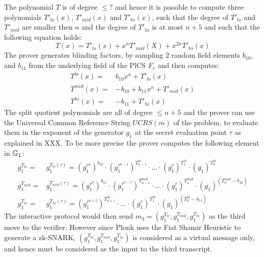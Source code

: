 The polynomial $T$ is of degree $\leq ?$ and hence it is possible to compute three polynomials $T'_{lo}(x)$, $T'_{mid}(x)$ and $T'_{hi}(x)$, such that the degree of $T'_{lo}$ and $T'_{mid}$ are smaller then $n$ and the degree of $T'_{hi}$ is at most $n+5$ and such that the following equation holds:
\begin{equation}
T(x) = T'_{lo}(x) + x^n T'_{mid}(X) + x^{2n} T'_{hi}(x)
\end{equation}
The prover generates blinding factors, by sampling $2$ random field elements $b_{10}$, and $b_{11}$ from the underlying field of the PlCS $F_r$ and then computes:
\begin{equation}
\begin{array}{rl}
T^{lo}(x)  = & b_{10} x^n + T'_{lo}(x) \\
T^{mid}(x) = & - b_{10} + b_{11} x^n +T'_{mid}(x) \\
T^{hi}(x)  = & - b_{11} + T'_{hi}(x)
\end{array}
\end{equation}
The split quotient polynomials are all of degree $\leq n+5$ and the prover can use the Universal Common Reference String $UCRS(m)$ of the problem, to evaluate them in the exponent of the generator $g_1$ at the secret evaluation point $\tau$ as explained in XXX. To be more precise the prover computes the following element in $\mathbb{G}_1$: 
\begin{equation}
\begin{array}{rl}
g_1^{T_{lo}} = & g_1^{T_{lo}(\tau)} = \left(g_1^{\tau^n}\right)^{b_{10}}\cdot
\left(g_1^{\tau^{n-1}}\right)^{T^{lo}_{n-1}}\cdot\ldots\cdot \left(g_1^{\tau}\right)^{T^{lo}_{1}}\cdot \left(g_1\right)^{T^{lo}_{0}}\\
g_1^{T_{mid}} = & g_1^{T_{mid}(\tau)} = \left(g_1^{\tau^n}\right)^{b_{11}}\cdot
\left(g_1^{\tau^{n-1}}\right)^{T^{mid}_{n-1}}\cdot\ldots\cdot \left(g_1^{\tau}\right)^{T^{mid}_{1}}\cdot \left(g_1\right)^{(T^{mid}_{0}-b_{10})}\\
g_1^{T_{hi}} = & g_1^{T_{hi}(\tau)} =
\left(g_1^{\tau^{n+5}}\right)^{T^{hi}_{n+1}}\cdot\ldots\cdot \left(g_1^{\tau}\right)^{T^{hi}_{1}}\cdot \left(g_1\right)^{(T^{hi}_{0}-b_{11})}
\end{array}
\end{equation}
The interactive protocol would then send $m_3=(g_1^{T_{lo}}, g_1^{T_{mid}}, g_1^{T_{hi}})$ as the third move to the verifier. However since Plonk uses the Fiat Shamir Heuristic to generate a zk-SNARK, $(g_1^{T_{lo}}, g_1^{T_{mid}}, g_1^{T_{hi}})$ is considered as a virtual message only, and hence must be considered as the input to the third transcript.

